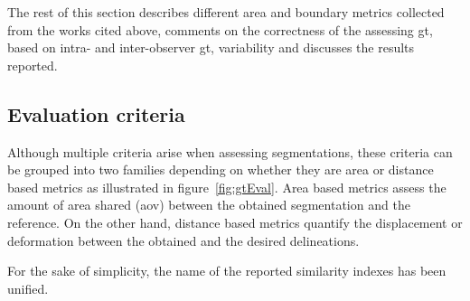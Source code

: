 The rest of this section describes different area and boundary metrics collected from the works cited above,  comments on the correctness of the assessing \ac{gt}, based on intra- and inter-observer \ac{gt}, variability and discusses the results reported.

\subsection{Evaluation criteria}\label{section:evalCriteria}
Although multiple criteria arise when assessing segmentations, these criteria can be grouped into two families depending on whether they are area or distance based metrics as illustrated in figure~\ref{fig:gtEval}. Area based metrics assess the amount of area shared (\acf{aov}) between the obtained segmentation and the reference. On the other hand, distance based metrics quantify the displacement or deformation between the obtained and the desired delineations. 

For the sake of simplicity, the name of the reported similarity indexes has been unified.

